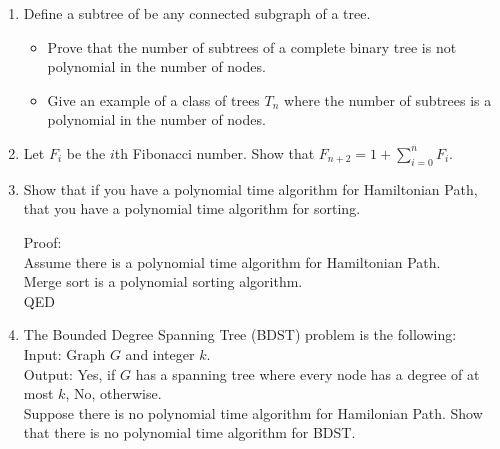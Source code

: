 \documentclass[12pt]{article}
\begin{document}
\begin{enumerate}
\item Define a subtree of be any connected subgraph of a tree.
    \begin{itemize}
        \item Prove that the number of subtrees of a complete binary tree is not
            polynomial in the number of nodes.
        \item Give an example of a class of trees ${T_n}$ where the number of
            subtrees is a polynomial in the number of nodes.
    \end{itemize}

\item Let $F_i$ be the $i$th Fibonacci number. Show that $F_{n+2} = 1 +
    \sum_{i=0}^n F_i$.

\item Show that if you have a polynomial time algorithm for Hamiltonian Path,
    that you have a polynomial time algorithm for sorting.

    Proof:\\
    Assume there is a polynomial time algorithm for Hamiltonian Path.\\
    Merge sort is a polynomial sorting algorithm.\\
    QED

\item The Bounded Degree Spanning Tree (BDST) problem is the following:\\
    Input: Graph $G$ and integer $k$.\\
    Output: Yes, if $G$ has a spanning tree where every node has a degree of at
    most $k$, No, otherwise.\\
    Suppose there is no polynomial time algorithm for Hamilonian Path. Show that
    there is no polynomial time algorithm for BDST.

\end{enumerate}
\end{document}

